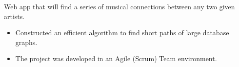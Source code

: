 \begin{resume}
\begin{position}
  Web app that will find a series of musical connections between any two given artists.
\end{position}
\begin{itemize}
\item Constructed an efficient algorithm to find short paths of large database graphs.
\end{itemize}
\begin{itemize}
\item The project was developed in an Agile (Scrum) Team environment.
\end{itemize}



\end{resume}
